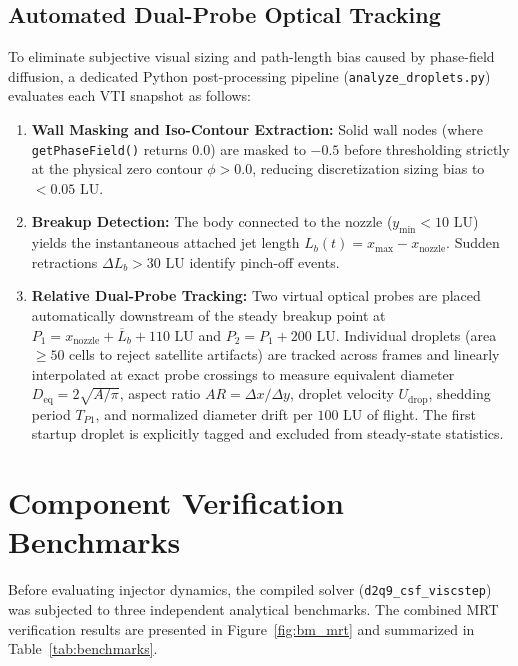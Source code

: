\documentclass[11pt,a4paper]{article}
\begin{document}
\subsection{Automated Dual-Probe Optical Tracking}

To eliminate subjective visual sizing and path-length bias caused by phase-field diffusion, a dedicated Python post-processing pipeline (\texttt{analyze\_droplets.py}) evaluates each VTI snapshot as follows:
\begin{enumerate}
    \item \textbf{Wall Masking and Iso-Contour Extraction:} Solid wall nodes (where \texttt{getPhaseField()} returns $0.0$) are masked to $-0.5$ before thresholding strictly at the physical zero contour $\phi > 0.0$, reducing discretization sizing bias to $< 0.05\text{ LU}$.
    \item \textbf{Breakup Detection:} The body connected to the nozzle ($y_{\min} < 10\text{ LU}$) yields the instantaneous attached jet length $L_b(t) = x_{\max} - x_{\mathrm{nozzle}}$. Sudden retractions $\Delta L_b > 30\text{ LU}$ identify pinch-off events.
    \item \textbf{Relative Dual-Probe Tracking:} Two virtual optical probes are placed automatically downstream of the steady breakup point at $P_1 = x_{\mathrm{nozzle}} + \overline{L}_b + 110\text{ LU}$ and $P_2 = P_1 + 200\text{ LU}$. Individual droplets (area $\ge 50$ cells to reject satellite artifacts) are tracked across frames and linearly interpolated at exact probe crossings to measure equivalent diameter $D_{\mathrm{eq}} = 2\sqrt{A/\pi}$, aspect ratio $AR = \Delta x / \Delta y$, droplet velocity $U_{\mathrm{drop}}$, shedding period $T_{P1}$, and normalized diameter drift per $100\text{ LU}$ of flight. The first startup droplet is explicitly tagged and excluded from steady-state statistics.
\end{enumerate}

\section{Component Verification Benchmarks}

Before evaluating injector dynamics, the compiled solver (\texttt{d2q9\_csf\_viscstep}) was subjected to three independent analytical benchmarks. The combined MRT verification results are presented in Figure~\ref{fig:bm_mrt} and summarized in Table~\ref{tab:benchmarks}.
\end{document}
